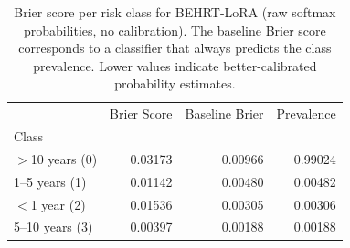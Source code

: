 \documentclass{article}
\begin{document}
\begin{table}
\caption{Brier score per risk class for BEHRT-LoRA (raw softmax probabilities, no calibration). The baseline Brier score corresponds to a classifier that always predicts the class prevalence. Lower values indicate better-calibrated probability estimates.}
\label{tab:brier_summary}
\begin{tabular}{lrrr}
\toprule
 & Brier Score & Baseline Brier & Prevalence \\
Class &  &  &  \\
\midrule
$>$10 years (0) & 0.03173 & 0.00966 & 0.99024 \\
1–5 years (1) & 0.01142 & 0.00480 & 0.00482 \\
$<$1 year (2) & 0.01536 & 0.00305 & 0.00306 \\
5–10 years (3) & 0.00397 & 0.00188 & 0.00188 \\
\bottomrule
\end{tabular}
\end{table}

\begin{table}
\caption{Brier score per risk class for BEHRT-LoRA, XGBoost, and Neural Network 
(raw softmax/softprob probabilities, no calibration), grouped by clinical risk category. 
The baseline Brier score corresponds to a classifier that always predicts the class prevalence. 
Lower values indicate better-calibrated probability estimates.}
\label{tab:brier_comparison}
\end{table}
\end{document}
